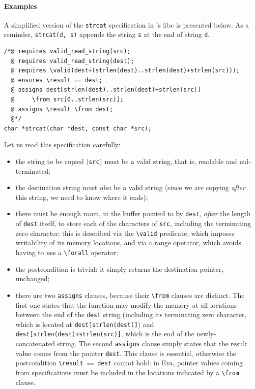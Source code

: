 \documentclass[web]{frama-c-book}
\newcommand{\Eva}{\textsf{Eva}}
\begin{document}
\paragraph{Examples}

A simplified version of the \texttt{strcat} specification in \FramaC's libc
is presented below. As a reminder, \verb+strcat(d, s)+ appends the string
\texttt{s} at the end of string \texttt{d}.

\begin{lstlisting}
/*@ requires valid_read_string(src);
  @ requires valid_read_string(dest);
  @ requires \valid(dest+(strlen(dest)..strlen(dest)+strlen(src)));
  @ ensures \result == dest;
  @ assigns dest[strlen(dest)..strlen(dest)+strlen(src)]
  @     \from src[0..strlen(src)];
  @ assigns \result \from dest;
  @*/
char *strcat(char *dest, const char *src);
\end{lstlisting}

Let us read this specification carefully:

\begin{itemize}
\item the string to be copied (\texttt{src}) must be a valid string,
  that is, readable and nul-terminated;
\item the destination string must {\em also} be a valid string
  (since we are copying {\em after} this string, we need to know where it ends);
\item there must be enough room, in the buffer pointed to by \texttt{dest},
  {\em after} the length of \texttt{dest} itself, to store each of the characters
  of \texttt{src}, including the terminating zero character;
  this is described via the \verb+\valid+ predicate,
  which imposes writability of its memory locations, and via a range operator,
  which avoids having to use a \verb+\forall+ operator;
\item the postcondition is trivial: it simply returns the destination pointer,
  unchanged;
\item there are two \texttt{assigns} clauses, because their \verb+\from+
  clauses are distinct. The first one states that the function may modify the
  memory at all locations between the end of the \texttt{dest} string
  (including its terminating zero character, which is located at
  \verb+dest[strlen(dest)]+) and \verb|dest[strlen(dest)+strlen(src)]|, which
  is the end of the newly-concatenated string.
  The second \texttt{assigns} clause simply states that the result value comes
  from the pointer \texttt{dest}. This clause is essential, otherwise the
  postcondition \verb+\result == dest+ cannot hold: in \Eva{}, pointer values
  coming from specifications must be included in the locations indicated by
  a \verb+\from+ clause.
\end{itemize}
\end{document}
